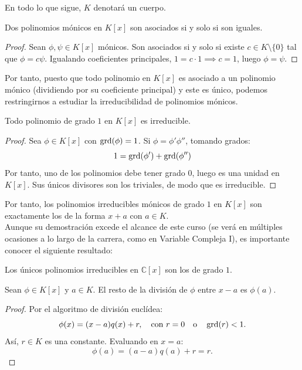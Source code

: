 En todo lo que sigue, $K$ denotará un cuerpo.

\begin{lema}
    Dos polinomios mónicos en $K[x]$ son asociados si y solo si son iguales.
\end{lema}
\begin{proof}
    Sean $\phi, \psi \in K[x]$ mónicos. Son asociados si y solo si existe $c \in K \setminus \{0\}$ tal que $\phi = c \psi$. Igualando coeficientes principales, $1 = c \cdot 1 \implies c = 1$, luego $\phi = \psi$.
\end{proof}



Por tanto, puesto que todo polinomio en $K[x]$ es asociado a un polinomio mónico (dividiendo por su coeficiente principal) y este es único, podemos restringirnos a estudiar la irreducibilidad de polinomios mónicos.

\begin{prop}
    Todo polinomio de grado $1$ en $K[x]$ es irreducible.
\end{prop}

\begin{proof}
    Sea $\phi \in K[x]$ con $\operatorname{grd}(\phi) = 1$. Si $\phi = \phi' \phi''$, tomando grados: $$1 = \operatorname{grd}(\phi') + \operatorname{grd}(\phi'')$$Por tanto, uno de los polinomios debe tener grado $0$, luego es una unidad en $K[x]$. Sus únicos divisores son los triviales, de modo que es irreducible.
\end{proof}

Por tanto, los polinomios irreducibles mónicos de grado $1$ en $K[x]$ son exactamente los de la forma $x + a$ con $a \in K$.\\

Aunque su demostración excede el alcance de este curso (se verá en múltiples ocasiones a lo largo de la carrera, como en Variable Compleja I), es importante conocer el siguiente resultado:
\begin{teo}
    Los únicos polinomios irreducibles en $\mathbb{C}[x]$ son los de grado $1$.
\end{teo}

\begin{teo}[de Ruffini]\label{teoRuffini}
    Sean $\phi \in K[x]$ y $a \in K$. El resto de la división de $\phi$ entre $x - a$ es $\phi(a)$.
\end{teo}
\begin{proof}
    Por el algoritmo de división euclídea:
    \[
        \phi(x) = (x - a)q(x) + r, \quad \text{con } r = 0 \quad \text{o} \quad \operatorname{grd}(r) < 1.
    \]
    Así, $r \in K$ es una constante. Evaluando en $x = a$:
    \[
        \phi(a) = (a - a)q(a) + r = r.
    \]
\end{proof}


